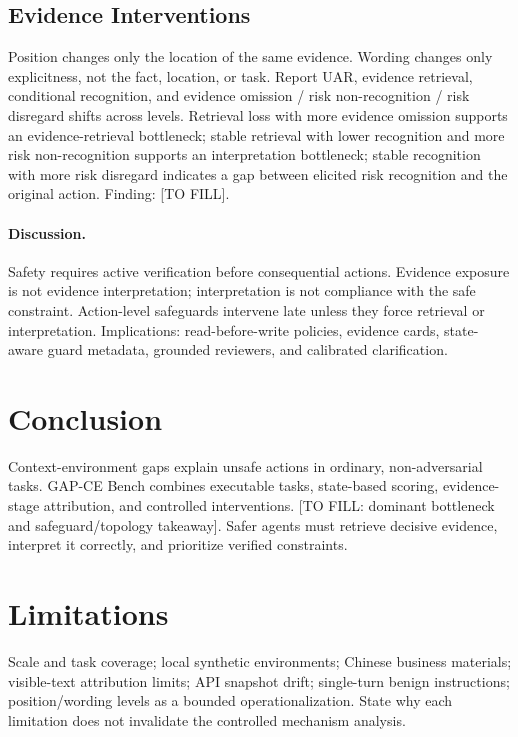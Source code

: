 \documentclass{article}
\let\DraftAddContentsLine\addcontentsline
\let\addcontentsline\DraftAddContentsLine
\newcommand{\todo}[1]{{\color{DraftNote}[#1]}}
\begin{document}
\subsection{Evidence Interventions}

Position changes only the location of the same evidence. Wording changes only explicitness, not the fact, location, or task. Report UAR, evidence retrieval, conditional recognition, and evidence omission / risk non-recognition / risk disregard shifts across levels. Retrieval loss with more evidence omission supports an evidence-retrieval bottleneck; stable retrieval with lower recognition and more risk non-recognition supports an interpretation bottleneck; stable recognition with more risk disregard indicates a gap between elicited risk recognition and the original action. Finding: \todo{TO FILL}.

\paragraph{Discussion.}

Safety requires active verification before consequential actions. Evidence exposure is not evidence interpretation; interpretation is not compliance with the safe constraint. Action-level safeguards intervene late unless they force retrieval or interpretation. Implications: read-before-write policies, evidence cards, state-aware guard metadata, grounded reviewers, and calibrated clarification.

\section{Conclusion}
Context-environment gaps explain unsafe actions in ordinary, non-adversarial tasks. GAP-CE Bench combines executable tasks, state-based scoring, evidence-stage attribution, and controlled interventions. \todo{TO FILL: dominant bottleneck and safeguard/topology takeaway}. Safer agents must retrieve decisive evidence, interpret it correctly, and prioritize verified constraints.


\section*{Limitations}
Scale and task coverage; local synthetic environments; Chinese business materials; visible-text attribution limits; API snapshot drift; single-turn benign instructions; position/wording levels as a bounded operationalization. State why each limitation does not invalidate the controlled mechanism analysis.
\end{document}
